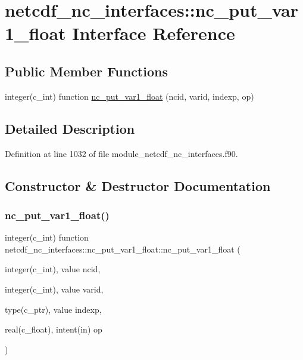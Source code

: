 \hypertarget{interfacenetcdf__nc__interfaces_1_1nc__put__var1__float}{}\section{netcdf\+\_\+nc\+\_\+interfaces\+:\+:nc\+\_\+put\+\_\+var1\+\_\+float Interface Reference}
\label{interfacenetcdf__nc__interfaces_1_1nc__put__var1__float}
\subsection*{Public Member Functions}
\begin{DoxyCompactItemize}
\item 
integer(c\+\_\+int) function \hyperlink{interfacenetcdf__nc__interfaces_1_1nc__put__var1__float_ab6122e96f89f5db30215473602d023d2}{nc\+\_\+put\+\_\+var1\+\_\+float} (ncid, varid, indexp, op)
\end{DoxyCompactItemize}


\subsection{Detailed Description}


Definition at line 1032 of file module\+\_\+netcdf\+\_\+nc\+\_\+interfaces.\+f90.



\subsection{Constructor \& Destructor Documentation}
\mbox{\label{interfacenetcdf__nc__interfaces_1_1nc__put__var1__float_ab6122e96f89f5db30215473602d023d2}} 
\subsubsection{\texorpdfstring{nc\+\_\+put\+\_\+var1\+\_\+float()}{nc\_put\_var1\_float()}}
{\footnotesize\ttfamily integer(c\+\_\+int) function netcdf\+\_\+nc\+\_\+interfaces\+::nc\+\_\+put\+\_\+var1\+\_\+float\+::nc\+\_\+put\+\_\+var1\+\_\+float (\begin{DoxyParamCaption}\item[{integer(c\+\_\+int), value}]{ncid,  }\item[{integer(c\+\_\+int), value}]{varid,  }\item[{type(c\+\_\+ptr), value}]{indexp,  }\item[{real(c\+\_\+float), intent(in)}]{op }\end{DoxyParamCaption})}



